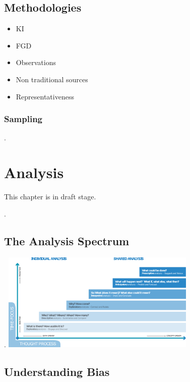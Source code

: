 \documentclass[
  a4paper,
  onecolumn,
  oneside]{book}
\providecommand{\tightlist}{%
  \setlength{\itemsep}{0pt}\setlength{\parskip}{0pt}}\usepackage{longtable,booktabs,array}
\begin{document}
\hypertarget{methodologies}{%
\section{Methodologies}\label{methodologies}}

\begin{itemize}
\tightlist
\item
  KI
\item
  FGD
\item
  Observations
\item
  Non traditional sources
\item
  Representativeness
\end{itemize}

\hypertarget{sampling}{%
\subsection{Sampling}\label{sampling}}

.

\hypertarget{analysis-1}{%
\chapter{Analysis}\label{analysis-1}}

This chapter is in draft stage.

.

\hypertarget{the-analysis-spectrum}{%
\section{The Analysis Spectrum}\label{the-analysis-spectrum}}

.
\includegraphics[width=0.7\textwidth,height=\textheight]{part1/./images/analysisspectrum.png}

\hypertarget{understanding-bias}{%
\section{Understanding Bias}\label{understanding-bias}}
\end{document}
